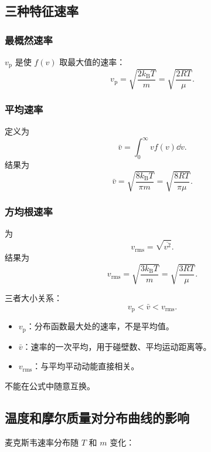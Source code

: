 \subsection{三种特征速率}

\subsubsection{最概然速率}

 \(v_{\mathrm p}\) 是使 \(f(v)\) 取最大值的速率：
\[
  \boxed{
  v_{\mathrm p}
  =
  \sqrt{\frac{2k_{\mathrm B}T}{m}}
  =
  \sqrt{\frac{2RT}{\mu}}
  }.
\]

\subsubsection{平均速率}

定义为
\[
  \bar v=\int_0^\infty vf(v)\dd v.
\]
结果为
\[
  \boxed{
  \bar v
  =
  \sqrt{\frac{8k_{\mathrm B}T}{\pi m}}
  =
  \sqrt{\frac{8RT}{\pi\mu}}
  }.
\]

\subsubsection{方均根速率}

为
\[
  v_{\mathrm{rms}}=\sqrt{\overline{v^2}}.
\]
结果为
\[
  \boxed{
  v_{\mathrm{rms}}
  =
  \sqrt{\frac{3k_{\mathrm B}T}{m}}
  =
  \sqrt{\frac{3RT}{\mu}}
  }.
\]

三者大小关系：
\[
  \boxed{
  v_{\mathrm p}<\bar v<v_{\mathrm{rms}}
  }.
\]

\begin{WarnBox}
\begin{itemize}
  \item \(v_{\mathrm p}\)：分布函数最大处的速率，不是平均值。
  \item \(\bar v\)：速率的一次平均，用于碰壁数、平均运动距离等。
  \item \(v_{\mathrm{rms}}\)：与平均平动动能直接相关。
\end{itemize}
不能在公式中随意互换。
\end{WarnBox}

\subsection{温度和摩尔质量对分布曲线的影响}

麦克斯韦速率分布随 \(T\) 和 \(m\) 变化：

